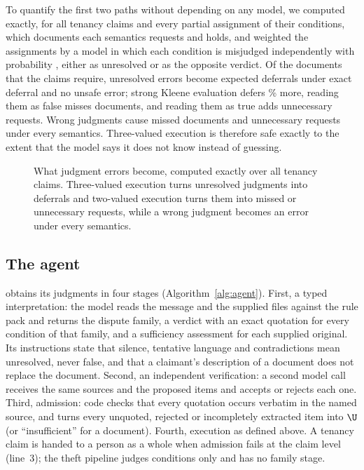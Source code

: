 To quantify the first two paths without depending on any model, we computed exactly, for all \propClaims{} tenancy claims and every partial assignment of their conditions, which documents each semantics requests and holds, and weighted the assignments by a model in which each condition is misjudged independently with probability \propEps, either as unresolved or as the opposite verdict. Of the \propRequired{} documents that the claims require, unresolved errors become \propExactDefer{} expected deferrals under exact deferral and no unsafe error; strong Kleene evaluation defers \propKleeneExtra\% more, reading them as false misses \propClosedMiss{} documents, and reading them as true adds \propEagerUnnec{} unnecessary requests. Wrong judgments cause \propFlipMiss{} missed documents and \propFlipUnnec{} unnecessary requests under every semantics. Three-valued execution is therefore safe exactly to the extent that the model says it does not know instead of guessing.

\begin{figure}[t]
\centering
{}
\caption{What judgment errors become, computed exactly over all \propClaims{} tenancy claims. Three-valued execution turns unresolved judgments into deferrals and two-valued execution turns them into missed or unnecessary requests, while a wrong judgment becomes an error under every semantics.}
\label{fig:fate}
\end{figure}

\subsection{The \casepath agent}
\label{sec:agent}

\casepath obtains its judgments in four stages (Algorithm~\ref{alg:agent}). First, a typed interpretation: the model reads the message and the supplied files against the rule pack and returns the dispute family, a verdict with an exact quotation for every condition of that family, and a sufficiency assessment for each supplied original. Its instructions state that silence, tentative language and contradictions mean unresolved, never false, and that a claimant's description of a document does not replace the document. Second, an independent verification: a second model call receives the same sources and the proposed items and accepts or rejects each one. Third, admission: code checks that every quotation occurs verbatim in the named source, and turns every unquoted, rejected or incompletely extracted item into $\U$ (or ``insufficient'' for a document). Fourth, execution as defined above. A tenancy claim is handed to a person as a whole when admission fails at the claim level (line~3); the theft pipeline judges conditions only and has no family stage.


